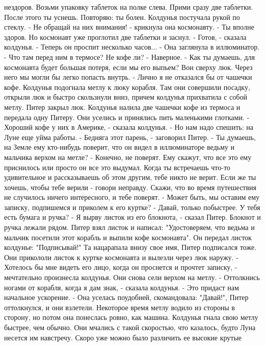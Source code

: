нездоров. Возьми упаковку таблеток на полке слева. Прими сразу две 
таблетки. После этого ты уснешь. Повторяю: ты болен.
    Колдунья постучала рукой по стеклу.
    - Не обращай на них внимания! - крикнула она космонавту. - Ты 
вполне здоров.
    Но космонавт уже проглотил две таблетки и заснул.
    - Готов, - сказала колдунья. - Теперь он проспит несколько 
часов... - Она заглянула в иллюминатор. - Что там перед ним в термосе? 
Не кофе ли?
    - Наверное.
    - Как ты думаешь, для космонавта будет большая потеря, если мы его 
выпьем? Вон сверху люк. Через него мы могли бы легко попасть внутрь.
    - Лично я не отказался бы от чашечки кофе.
    Колдунья подогнала метлу к люку корабля. Там они совершили 
посадку, открыли люк и быстро скользнули вниз, причем колдунья 
прихватила с собой метлу. Питер закрыл люк. Колдунья налила две 
чашечки кофе из термоса и передала одну Питеру. Они уселись и 
принялись пить маленькими глотками.
    - Хороший кофе у них в Америке, - сказала колдунья. - Но нам надо 
спешить: на Луне еще уйма работы.
    - Бедняга этот парень, - заговорил Питер. - Ты думаешь, на Земле 
ему кто-нибудь поверит, что он видел в иллюминаторе ведьму и мальчика 
верхом на метле?
    - Конечно, не поверят. Ему скажут, что все это ему приснилось или 
просто он все это выдумал. Когда ты встречаешь что-то удивительное и 
рассказываешь об этом другим, тебе никто не верит. Если же ты хочешь, 
чтобы тебе верили - говори неправду. Скажи, что во время путешествия 
не случилось ничего интересного, и тебе поверят.
    - Может быть, мы оставим ему записку, подпишемся и приколем к его 
куртке?
    - Давай, только побыстрее. У тебя есть бумага и ручка?
    - Я вырву листок из его блокнота, - сказал Питер. Блокнот и ручка 
лежали рядом.
    Питер взял листок и написал: "Удостоверяем, что ведьма и мальчик 
посетили этот корабль и выпили кофе космонавта".
    Он передал листок колдунье: "Подписывай!" Та нацарапала внизу свое 
имя, Питер подписался тоже. Они прикололи листок к куртке космонавта и 
вылезли через люк наружу.
    - Хотелось бы мне видеть его лицо, когда он проснется и прочтет 
записку, - мечтательно произнесла колдунья.
    Они снова сели верхом на метлу.
    - Оттолкнись ногами от корабля, когда я дам знак, - сказала 
колдунья. - Это придаст нам начальное ускорение. - Она уселась 
поудобней, скомандовала: "Давай!", Питер оттолкнулся, и они взлетели.
    Некоторое время метлу водило из стороны в сторону, но потом она 
понеслась ровно, как машина. Колдунья гнала свою метлу быстрее, чем 
обычно. Они мчались с такой скоростью, что казалось, будто Луна 
несется им навстречу. Скоро уже можно было различить ее высокие крутые 
